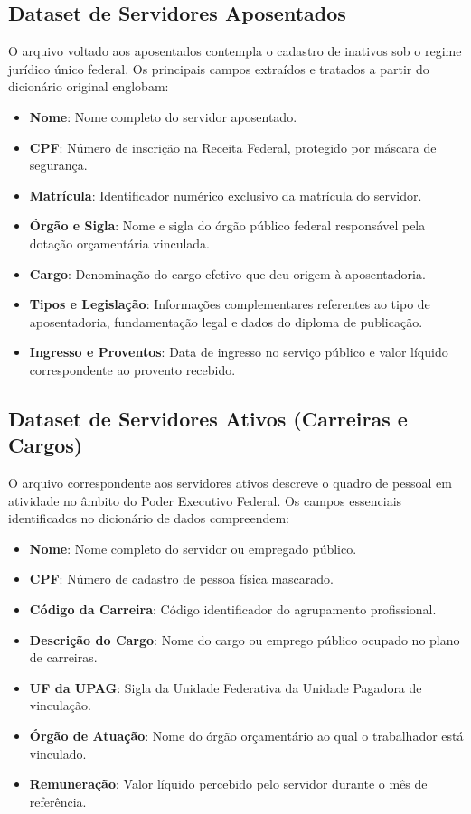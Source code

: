 \documentclass[12pt,a4paper]{article}
\begin{document}
\subsection{Dataset de Servidores Aposentados}
O arquivo voltado aos aposentados contempla o cadastro de inativos sob o regime jurídico único federal. Os principais campos extraídos e tratados a partir do dicionário original englobam:
\begin{itemize}
    \item \textbf{Nome}: Nome completo do servidor aposentado.
    \item \textbf{CPF}: Número de inscrição na Receita Federal, protegido por máscara de segurança.
    \item \textbf{Matrícula}: Identificador numérico exclusivo da matrícula do servidor.
    \item \textbf{Órgão e Sigla}: Nome e sigla do órgão público federal responsável pela dotação orçamentária vinculada.
    \item \textbf{Cargo}: Denominação do cargo efetivo que deu origem à aposentadoria.
    \item \textbf{Tipos e Legislação}: Informações complementares referentes ao tipo de aposentadoria, fundamentação legal e dados do diploma de publicação.
    \item \textbf{Ingresso e Proventos}: Data de ingresso no serviço público e valor líquido correspondente ao provento recebido.
\end{itemize}

\subsection{Dataset de Servidores Ativos (Carreiras e Cargos)}
O arquivo correspondente aos servidores ativos descreve o quadro de pessoal em atividade no âmbito do Poder Executivo Federal. Os campos essenciais identificados no dicionário de dados compreendem:
\begin{itemize}
    \item \textbf{Nome}: Nome completo do servidor ou empregado público.
    \item \textbf{CPF}: Número de cadastro de pessoa física mascarado.
    \item \textbf{Código da Carreira}: Código identificador do agrupamento profissional.
    \item \textbf{Descrição do Cargo}: Nome do cargo ou emprego público ocupado no plano de carreiras.
    \item \textbf{UF da UPAG}: Sigla da Unidade Federativa da Unidade Pagadora de vinculação.
    \item \textbf{Órgão de Atuação}: Nome do órgão orçamentário ao qual o trabalhador está vinculado.
    \item \textbf{Remuneração}: Valor líquido percebido pelo servidor durante o mês de referência.
\end{itemize}
\end{document}
